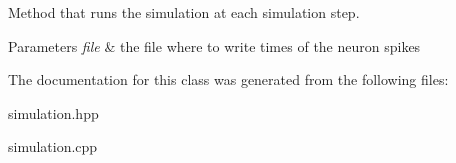 Method that runs the simulation at each simulation step. 


\begin{DoxyParams}{Parameters}
{\em file} & the file where to write times of the neuron spikes \\
\hline
\end{DoxyParams}


The documentation for this class was generated from the following files\-:\begin{DoxyCompactItemize}
\item 
simulation.\-hpp\item 
simulation.\-cpp\end{DoxyCompactItemize}
